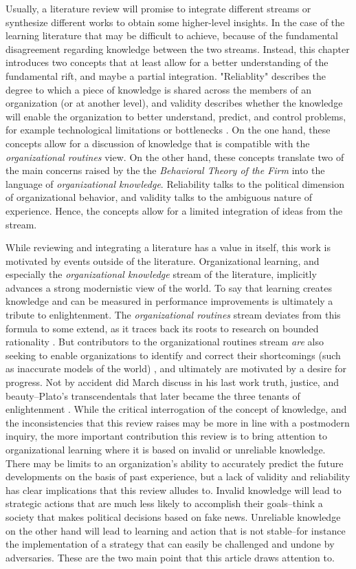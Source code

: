 Usually, a literature review will promise to integrate different streams or synthesize different works to obtain some higher-level insights. In the case of the learning literature that may be difficult to achieve, because of the fundamental disagreement regarding knowledge between the two streams. Instead, this chapter introduces two concepts that at least allow for a better understanding of the fundamental rift, and maybe a partial integration. "Reliablity" describes the degree to which a piece of knowledge is shared across the members of an organization (or at another level), and validity describes whether the knowledge will enable the organization to better understand, predict, and control problems, for example technological limitations or bottlenecks \cite{Rerup2020}. On the one hand, these concepts allow for a discussion of knowledge that is compatible with the \textit{organizational routines} view. On the other hand, these concepts translate two of the main concerns raised by the the \textit{Behavioral Theory of the Firm} into the language of \textit{organizational knowledge}. Reliability talks to the political dimension of organizational behavior, and validity talks to the ambiguous nature of experience. Hence, the concepts allow for a limited integration of ideas from the stream.

While reviewing and integrating a literature has a value in itself, this work is motivated by events outside of the literature. Organizational learning, and especially the \textit{organizational knowledge} stream of the literature, implicitly advances a strong modernistic view of the world. To say that learning creates knowledge and can be measured in performance improvements is ultimately a tribute to enlightenment. The \textit{organizational routines} stream deviates from this formula to some extend, as it traces back its roots to research on bounded rationality \citep{March1963}. But contributors to the organizational routines stream \textit{are} also seeking to enable organizations to identify and correct their shortcomings (such as inaccurate models of the world) \citep[e.g.,][]{Argyris1978}, and ultimately are motivated by a desire for progress. Not by accident did March discuss in his last work truth, justice, and beauty--Plato's transcendentals that later became the three tenants of enlightenment \citep{March2010}. While the critical interrogation of the concept of knowledge, and the inconsistencies that this review raises may be more in line with a postmodern inquiry, the more important contribution this review is to bring attention to organizational learning where it is based on invalid or unreliable knowledge. There may be limits to an organization's ability to accurately predict the future developments on the basis of past experience, but a lack of validity and reliability has clear implications that this review alludes to. Invalid knowledge will lead to strategic actions that are much less likely to accomplish their goals--think a society that makes political decisions based on fake news. Unreliable knowledge on the other hand will lead to learning and action that is not stable--for instance the implementation of a strategy that can easily be challenged and undone by adversaries. These are the two main point that this article draws attention to.

